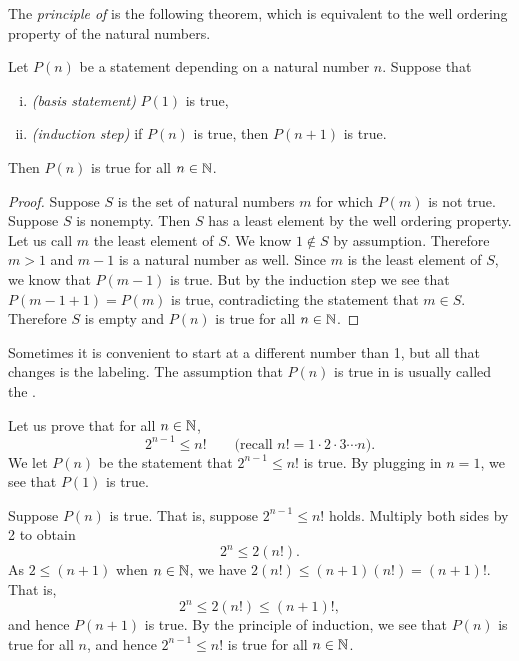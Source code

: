 The \emph{principle of } is
the following theorem, which is equivalent to the well ordering property of
the natural numbers.

\begin{thm} \label{induction:thm}
Let $P(n)$ be a statement depending on a natural number $n$.  Suppose that
\begin{enumerate}[(i)]
\item \emph{(basis statement)} $P(1)$ is true,
\item \emph{(induction step)} if $P(n)$ is true, then $P(n+1)$ is true.
\end{enumerate}
Then $P(n)$ is true for all $n \in {\mathbb{N}}$.
\end{thm}

\begin{proof}
Suppose $S$ is the set of natural numbers $m$ for which $P(m)$ is
not true.  Suppose
$S$ is nonempty.  Then $S$ has a least element by the well ordering
property.  Let us call $m$ the least element of $S$.  We know $1 \notin
S$ by assumption.  Therefore $m > 1$ and $m-1$ is a natural number as well.
Since $m$ is the least element of $S$, we know that $P(m-1)$ is true.
But by the induction step we see that $P(m-1+1) = P(m)$ is true, 
contradicting the statement that $m \in S$.  Therefore $S$ is empty and 
$P(n)$ is true for all $n \in {\mathbb{N}}$.
\end{proof}

Sometimes it is convenient to start at a different number than 1, but 
all that changes is the labeling.  The assumption that
$P(n)$ is true in 
is usually called the \emph{}.

\begin{example}
Let us prove that for all $n \in {\mathbb{N}}$,
\begin{equation*}
2^{n-1} \leq n! \qquad \text{(recall } n! = 1 \cdot 2 \cdot 3 \cdots n\text{)}.
\end{equation*}
We let $P(n)$ be the statement that
$2^{n-1} \leq n!$ is true.  By plugging in $n=1$, we see that $P(1)$
is true.

Suppose $P(n)$ is true.  That is, suppose 
$2^{n-1} \leq n!$ holds.  Multiply both sides by 2 to obtain
\begin{equation*}
2^n \leq 2(n!) .
\end{equation*}
As $2 \leq (n+1)$ when $n \in {\mathbb{N}}$, we have
$2(n!) \leq (n+1)(n!) = (n+1)!$.  That is,
\begin{equation*}
2^n \leq 2(n!) \leq  (n+1)!,
\end{equation*}
and hence $P(n+1)$ is true.  By the principle of induction, we see that
$P(n)$
is true for all $n$, and hence
$2^{n-1} \leq n!$ is true for all $n \in {\mathbb{N}}$.
\end{example}

